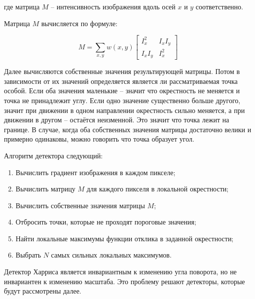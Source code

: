 \begin{flushleft}
    где матрица $M$ -- интенсивность изображения вдоль осей $x$ и $y$ соответственно.
\end{flushleft}

Матрица $M$ вычисляется по формуле:

\begin{equation}
    M = \sum_{x, y} w(x, y) \begin{bmatrix} I_x^2 & I_x I_y \\ I_x I_y & I_x^2 \end{bmatrix}
\end{equation}

Далее вычисляются собственные значения результирующей матрицы. Потом в зависимости от их значений определяется является ли рассматриваемая точка особой. Если оба значения маленькие -- значит что окрестность не меняется и точка не принадлежит углу. Если одно значение существенно больше другого, значит при движении в одном направлении окрестность сильно меняется, а при движении в другом -- остаётся неизменной. Это значит что точка лежит на границе. В случае, когда оба собственных значения матрицы достаточно велики и примерно одинаковы, можно говорить что точка образует угол.

Алгоритм детектора следующий:
\begin{enumerate}
    \item Вычислить градиент изображения в каждом пикселе;
    \item Вычислить матрицу $M$ для каждого пикселя в локальной окрестности;
    \item Вычислить собственные значения матрицы $M$;
    \item Отбросить точки, которые не проходят пороговые значения;
    \item Найти локальные максимумы функции отклика в заданной окрестности;
    \item Выбрать $N$ самых сильных локальных максимумов.
\end{enumerate}

Детектор Харриса является инвариантным к изменению угла поворота, но не инвариантен к изменению масштаба. Это проблему решают детекторы, которые будут рассмотрены далее.